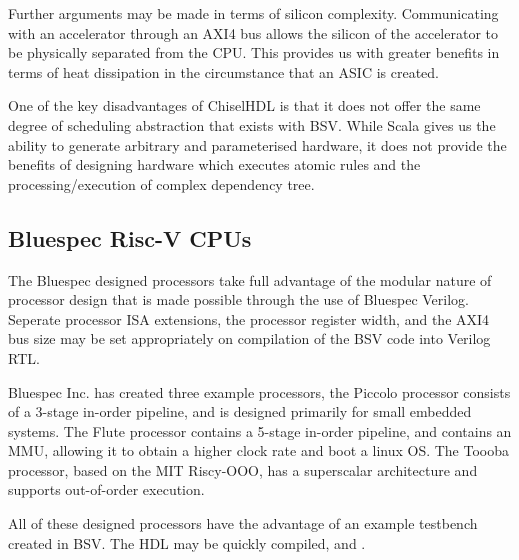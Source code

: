 \documentclass[a4paper,8pt]{report}
\begin{document}
Further arguments may be made in terms of silicon complexity. Communicating with
an accelerator through an AXI4 bus allows the silicon of the accelerator to be
physically separated from the CPU. This provides us with greater benefits in
terms of heat dissipation in the circumstance that an ASIC is created.

One of the key disadvantages of ChiselHDL is that it does not offer the same
degree of scheduling abstraction that exists with BSV. While Scala gives us the
ability to generate arbitrary and parameterised hardware, it does not provide
the benefits of designing hardware which executes atomic rules and the
processing/execution of complex dependency tree.

\subsection{Bluespec Risc-V CPUs}
The Bluespec designed processors take full advantage of the modular nature of
processor design that is made possible through the use of Bluespec Verilog.
Seperate processor ISA extensions, the processor register width, and the AXI4
bus size may be set appropriately on compilation of the BSV code into Verilog
RTL.

Bluespec Inc. has created three example processors, the Piccolo processor
consists of a 3-stage in-order pipeline, and is designed primarily for small
embedded systems. The Flute processor contains a 5-stage in-order pipeline, and
contains an MMU, allowing it to obtain a higher clock rate and boot a linux OS.
The Toooba processor, based on the MIT Riscy-OOO, has a superscalar architecture
and supports out-of-order execution.

All of these designed processors have the advantage of an example testbench
created in BSV. The HDL may be quickly compiled, and .



\end{document}
